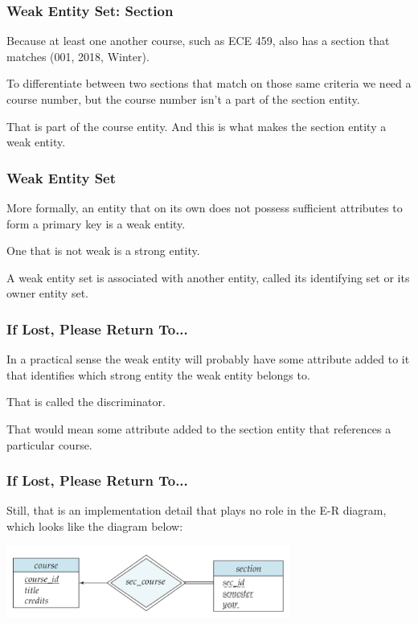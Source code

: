 \begin{frame}
\frametitle{Weak Entity Set: Section}

Because at least one another course, such as ECE 459, also has a section that matches (001, 2018, Winter). 

To differentiate between two sections that match on those same criteria we need a course number, but the course number isn't a part of the section entity. 

That is part of the course entity. And this is what makes the section entity a weak entity.

\end{frame}



\begin{frame}
\frametitle{Weak Entity Set}

More formally, an entity that on its own does not possess sufficient attributes to form a primary key is a weak entity. 

One that is not weak is a strong entity. 

A weak entity set is associated with another entity, called its identifying set or its owner entity set.

\end{frame}



\begin{frame}
\frametitle{If Lost, Please Return To...}

In a practical sense the weak entity will probably have some attribute added to it that identifies which strong entity the weak entity belongs to. 

That is called the \alert{discriminator}. 

That would mean some attribute added to the section entity that references a particular course. 

\end{frame}



\begin{frame}
\frametitle{If Lost, Please Return To...}


Still, that is an implementation detail that plays no role in the E-R diagram, which looks like the diagram below:

\begin{center}
\includegraphics[width=0.7\textwidth]{images/weak-entity-set}
\end{center}


\end{frame}


